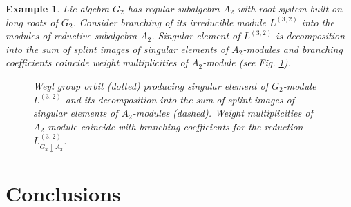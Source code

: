\documentclass[12pt]{article}
\newtheorem{example}{Example}
\begin{document}
\begin{example}
   Lie algebra $G_{2}$ has regular subalgebra $A_{2}$ with root system built on long roots of $G_{2}$. Consider branching of its irreducible module $L^{(3,2)}$ into the modules of reductive subalgebra $A_{2}$. Singular element of $L^{(3,2)}$ is decomposition into the sum of splint images of singular elements of $A_{2}$-modules and branching coefficients coincide weight multiplicities of $A_{2}$-module (see Fig. \ref{fig:g2_splint}).


  \begin{figure}[h!bt]
  \noindent{}

  \caption{Weyl group orbit (dotted) producing singular element of $G_{2}$-module $L^{(3,2)}$ and its decomposition into the sum of splint images of singular elements of $A_{2}$-modules (dashed). Weight multiplicities of $A_{2}$-module coincide with branching coefficients for the reduction $L^{(3,2)}_{G_{2}\downarrow A_{2}}$.}


 \label{fig:g2_splint}
\end{figure}

\end{example}

\section{Conclusions}
\label{sec:conclusions}
\end{document}
